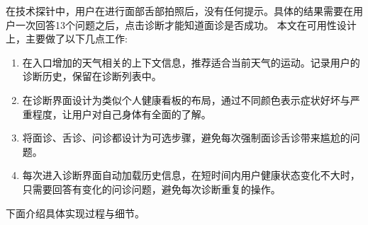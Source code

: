 
在技术探针中，用户在进行面部舌部拍照后，没有任何提示。具体的结果需要在用户一次回答13个问题之后，点击诊断才能知道面诊是否成功。
本文在可用性设计上，主要做了以下几点工作:
\begin{enumerate}
    \item 在入口增加的天气相关的上下文信息，推荐适合当前天气的运动。记录用户的诊断历史，保留在诊断列表中。
    \item 在诊断界面设计为类似个人健康看板的布局，通过不同颜色表示症状好坏与严重程度，让用户对自己身体有全面的了解。
    \item 将面诊、舌诊、问诊都设计为可选步骤，避免每次强制面诊舌诊带来尴尬的问题。
    \item 每次进入诊断界面自动加载历史信息，在短时间内用户健康状态变化不大时，只需要回答有变化的问诊问题，避免每次诊断重复的操作。
\end{enumerate}

下面介绍具体实现过程与细节。


